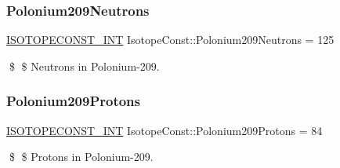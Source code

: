 \subsubsection{\texorpdfstring{Polonium209\+Neutrons}{Polonium209Neutrons}}
{\footnotesize\ttfamily \mbox{\hyperlink{group___isotope_const-_macros_ga5f18360b3e99483a35c32d789e62621c}{I\+S\+O\+T\+O\+P\+E\+C\+O\+N\+S\+T\+\_\+\+I\+NT}} Isotope\+Const\+::\+Polonium209\+Neutrons = 125}

\$ \$ Neutrons in Polonium-\/209. \mbox{\label{group___isotope_const-_polonium-_po209_ga378b3dd3a116e97eb108713cf80d41f2}} 
\subsubsection{\texorpdfstring{Polonium209\+Protons}{Polonium209Protons}}
{\footnotesize\ttfamily \mbox{\hyperlink{group___isotope_const-_macros_ga5f18360b3e99483a35c32d789e62621c}{I\+S\+O\+T\+O\+P\+E\+C\+O\+N\+S\+T\+\_\+\+I\+NT}} Isotope\+Const\+::\+Polonium209\+Protons = 84}

\$ \$ Protons in Polonium-\/209. 